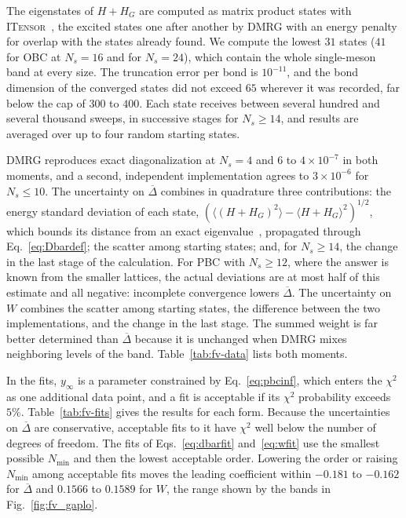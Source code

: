 \documentclass[twocolumn,superscriptaddress,showpacs,nofootinbib,notitlepage,preprintnumbers,secnumarabic,amssymb, floatfix, nobibnotes, aps, prd]{revtex4-2}
\begin{document}
The eigenstates of $H+H_G$ are computed as matrix product states with \textsc{ITensor}~\cite{Fishman:2020gel}, the excited states one after another by DMRG with an energy penalty for overlap with the states already found.
We compute the lowest $31$ states ($41$ for OBC at $N_s=16$ and for $N_s=24$), which contain the whole single-meson band at every size.
The truncation error per bond is $10^{-11}$, and the bond dimension of the converged states did not exceed $65$ wherever it was recorded, far below the cap of $300$ to $400$.
Each state receives between several hundred and several thousand sweeps, in successive stages for $N_s\ge14$, and results are averaged over up to four random starting states.

DMRG reproduces exact diagonalization at $N_s=4$ and $6$ to $4\times10^{-7}$ in both moments, and a second, independent implementation agrees to $3\times10^{-6}$ for $N_s\le10$.
The uncertainty on $\overline{\Delta}$ combines in quadrature three contributions: the energy standard deviation of each state, $(\langle (H+H_G)^2\rangle-\langle H+H_G\rangle^2)^{1/2}$, which bounds its distance from an exact eigenvalue~\cite{Weinstein:1934}, propagated through Eq.~\eqref{eq:Dbardef}; the scatter among starting states; and, for $N_s\ge14$, the change in the last stage of the calculation.
For PBC with $N_s\ge12$, where the answer is known from the smaller lattices, the actual deviations are at most half of this estimate and all negative: incomplete convergence lowers $\overline{\Delta}$.
The uncertainty on $W$ combines the scatter among starting states, the difference between the two implementations, and the change in the last stage.
The summed weight is far better determined than $\overline{\Delta}$ because it is unchanged when DMRG mixes neighboring levels of the band.
Table~\ref{tab:fv-data} lists both moments.



In the fits, $y_\infty$ is a parameter constrained by Eq.~\eqref{eq:pbcinf}, which enters the $\chi^2$ as one additional data point, and a fit is acceptable if its $\chi^2$ probability exceeds $5\%$.
Table~\ref{tab:fv-fits} gives the results for each form.
Because the uncertainties on $\overline{\Delta}$ are conservative, acceptable fits to it have $\chi^2$ well below the number of degrees of freedom.
The fits of Eqs.~\eqref{eq:dbarfit} and~\eqref{eq:wfit} use the smallest possible $N_{\min}$ and then the lowest acceptable order.
Lowering the order or raising $N_{\min}$ among acceptable fits moves the leading coefficient within $-0.181$ to $-0.162$ for $\overline{\Delta}$ and $0.1566$ to $0.1589$ for $W$, the range shown by the bands in Fig.~\ref{fig:fv_gaplo}.



\end{document}
